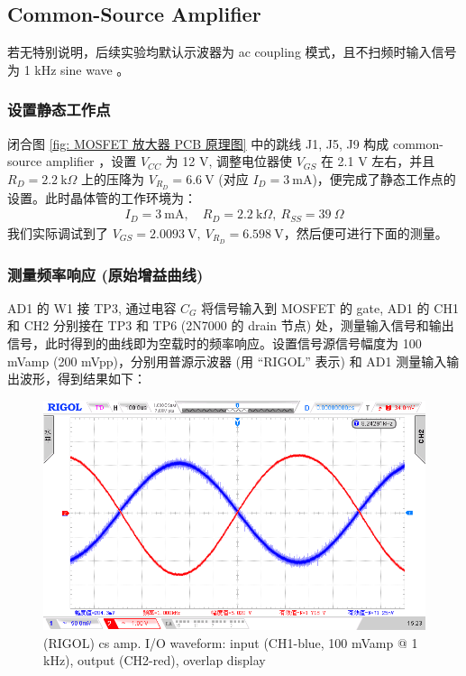 \documentclass[UTF8]{article}
\begin{document}
\newpage
\subsection{Common-Source Amplifier}
\vspace*{-3mm}
\begin{redbox}
    若无特别说明，后续实验均默认示波器为 ac coupling 模式，且不扫频时输入信号为 1 kHz sine wave 。
\end{redbox}

\subsubsection{设置静态工作点}

闭合图 \ref{fig: MOSFET 放大器 PCB 原理图} 中的跳线 J1, J5, J9 构成 common-source amplifier ，设置 $V_{CC}$ 为 12 V, 调整电位器使 $V_{GS}$ 在 2.1 V 左右，并且 $R_D = 2.2\ \mathrm{k}\Omega$ 上的压降为 $V_{R_D} = 6.6 \ \mathrm{V}$ (对应 $I_D = 3 \ \mathrm{mA}$)，便完成了静态工作点的设置。此时晶体管的工作环境为：
\begin{gather}
I_D = 3 \ \mathrm{mA},\quad R_D = 2.2 \ \mathrm{k}\Omega, \ R_{SS} = 39 \ \Omega
\end{gather}
我们实际调试到了 $V_{GS} = 2.0093 \ \mathrm{V},\  V_{R_D} = 6.598 \ \mathrm{V}$，然后便可进行下面的测量。

\subsubsection{测量频率响应 (原始增益曲线)}

AD1 的 W1 接 TP3, 通过电容 $C_G$ 将信号输入到 MOSFET 的 gate, AD1 的 CH1 和 CH2 分别接在 TP3 和 TP6 (2N7000 的 drain 节点) 处，测量输入信号和输出信号，此时得到的曲线即为空载时的频率响应。设置信号源信号幅度为 100 mVamp (200 mVpp)，分别用普源示波器 (用 ``RIGOL'' 表示) 和 AD1 测量输入输出波形，得到结果如下：

\begin{figure}[H]\centering
    \includegraphics[width=\columnwidth]{LCE-04-场效应管/assets/cs amp/CS 输入输出波形 RIGOL.png}
    \caption{(RIGOL) cs amp. I/O waveform: input (CH1-blue, 100 mVamp @ 1 kHz), output (CH2-red), overlap display}
\end{figure}
\end{document}
